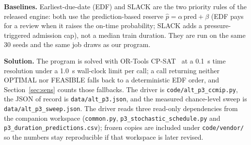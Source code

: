 \documentclass{swmcmthesis}
\begin{document}
\textbf{Baselines.} Earliest-due-date (EDF) and SLACK are the two priority rules of the released engine: both use the prediction-based reserve $\hat p=\alpha\,\mathrm{pred}+\beta$ (EDF pays for a review when it raises the on-time probability; SLACK adds a pressure-triggered admission cap), not a median train duration. They are run on the same 30 seeds and the same job draws as our program.

\textbf{Solution.} The program is solved with OR-Tools CP-SAT~\cite{ref10} at a 0.1~s time resolution under a 1.0~s wall-clock limit per call; a call returning neither OPTIMAL nor FEASIBLE falls back to a deterministic EDF order, and Section~\ref{sec:sens} counts those fallbacks. The driver is \texttt{code/alt\_p3\_ccmip.py}, the JSON of record is \texttt{data/alt\_p3.json}, and the measured chance-level sweep is \texttt{data/alt\_p3\_sweep.json}. The driver reads three read-only dependencies from the companion workspace (\texttt{common.py}, \texttt{p3\_stochastic\_schedule.py} and \texttt{p3\_duration\_predictions.csv}); frozen copies are included under \texttt{code/vendor/} so the numbers stay reproducible if that workspace is later revised.
\end{document}
